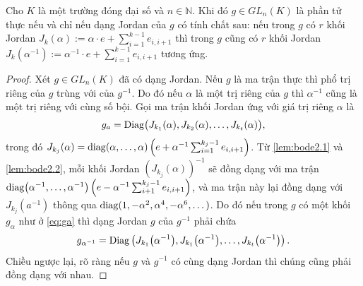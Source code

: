 \begin{thm}\label{thm:2.5}
Cho \(K\) là một trường đóng đại số và \(n\in\mathbb{N}\).  
Khi đó \(g\in GL_n(K)\) là phần tử thực nếu và chỉ nếu dạng Jordan của \(g\) có tính chất sau: nếu trong \(g\) có \(r\) khối Jordan \(J_k(\alpha):=\alpha\cdot e+\sum_{i=1}^{k-1} e_{i,i+1}\) thì trong \(g\) cũng có \(r\) khối Jordan \(J_k(\alpha^{-1}):=\alpha^{-1}\cdot e+\sum_{i=1}^{k-1}e_{i,i+1}\) tương ứng.
\end{thm}

\begin{proof}
Xét \(g\in GL_n(K)\) đã có dạng Jordan. Nếu \(g\) là ma trận thực thì phổ trị riêng của \(g\) trùng với của \(g^{-1}\). Do đó nếu $\alpha$ là một trị riêng của \(g\) thì $\alpha^{-1}$ cũng là một trị riêng với cùng số bội. Gọi ma trận khối Jordan ứng với giá trị riêng \(\alpha\) là
\begin{equation}\label{eq:ga}
 g_a=\operatorname{Diag}\bigl(J_{k_1}(\alpha),J_{k_2}(\alpha),\dots,J_{k_t}(\alpha)\bigr),
\end{equation}
trong đó \(J_{k_j}(\alpha)=\operatorname{diag}(\alpha,\dots,\alpha)\left(e+\alpha^{-1}\sum_{i=1}^{k_j-1} e_{i,i+1}\right)\). Từ \cref{lem:bode2.1} và \cref{lem:bode2.2}, mỗi khối Jordan \(\left(J_{k_j}(\alpha)\right)^{-1}\) sẽ đồng dạng với ma trận \(\operatorname{diag}\bigl(\alpha^{-1},\dots,\alpha^{-1}\bigr)\left(e-\alpha^{-1}\sum_{i+1}^{k_j-1} e_{i,i+1}\right)\), và ma trận này lại đồng dạng với \(J_{k_j}(a^{-1})\) thông qua \(\operatorname{diag}(1,-\alpha^2,\alpha^4,-\alpha^6,\dots)\). Do đó nếu trong $g$ có một khối \(g_\alpha\) như ở \cref{eq:ga} thì dạng Jordan $g$ của \(g^{-1}\) phải chứa
\[ g_{\alpha^{-1}} = \operatorname{Diag}\left(J_{k_1}\bigl(\alpha^{-1}\bigr),J_{k_1}\bigl(\alpha^{-1}\bigr),\dots,J_{k_t}\bigl(\alpha^{-1}\bigr)\right).
\]
Chiều ngược lại, rõ ràng nếu $g$ và $g^{-1}$ có cùng dạng Jordan thì chúng cũng phải đồng dạng với nhau.
\end{proof}

